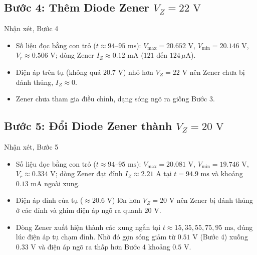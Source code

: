 \Needspace{0.4\textheight}
\subsection{Bước 4: Thêm Diode Zener \texorpdfstring{$V_Z = 22\text{ V}$}{VZ = 22V}}

\simresult
{}

\begin{notebox}{Nhận xét, Bước 4}
  \begin{itemize}[leftmargin=1.5em,itemsep=2pt,topsep=2pt]
    \item Số liệu đọc bằng con trỏ ($t \approx 94\text{--}95\text{ ms}$): $V_{\max} = 20.652\text{ V}$, $V_{\min} = 20.146\text{ V}$, $V_r \approx 0.506\text{ V}$; dòng Zener $I_Z \approx 0.12\text{ mA}$ ($121$ đến $124\,\mu\text{A}$).
    \item Điện áp trên tụ (không quá $20.7\text{ V}$) nhỏ hơn $V_Z = 22\text{ V}$ nên Zener chưa bị đánh thủng, $I_Z \approx 0$.
    \item Zener chưa tham gia điều chỉnh, dạng sóng ngõ ra giống Bước 3.
  \end{itemize}
\end{notebox}

\Needspace{0.62\textheight}
\subsection{Bước 5: Đổi Diode Zener thành \texorpdfstring{$V_Z = 20\text{ V}$}{VZ = 20V}}
\simresult
{}

\begin{notebox}{Nhận xét, Bước 5}
  \begin{itemize}[leftmargin=1.5em,itemsep=2pt,topsep=2pt]
    \item Số liệu đọc bằng con trỏ ($t \approx 94\text{--}95\text{ ms}$): $V_{\max} = 20.081\text{ V}$, $V_{\min} = 19.746\text{ V}$, $V_r \approx 0.334\text{ V}$; dòng Zener đạt đỉnh $I_Z \approx 2.21\text{ A}$ tại $t = 94.9\text{ ms}$ và khoảng $0.13\text{ mA}$ ngoài xung.
    \item Điện áp đỉnh của tụ ($\approx 20.6\text{ V}$) lớn hơn $V_Z = 20\text{ V}$ nên Zener bị đánh thủng ở các đỉnh và ghim điện áp ngõ ra quanh $20\text{ V}$.
    \item Dòng Zener xuất hiện thành các xung ngắn tại $t \approx 15, 35, 55, 75, 95\text{ ms}$, đúng lúc điện áp tụ chạm đỉnh. Nhờ đó gợn sóng giảm từ $0.51\text{ V}$ (Bước 4) xuống $0.33\text{ V}$ và điện áp ngõ ra thấp hơn Bước 4 khoảng $0.5\text{ V}$.
  \end{itemize}
\end{notebox}

